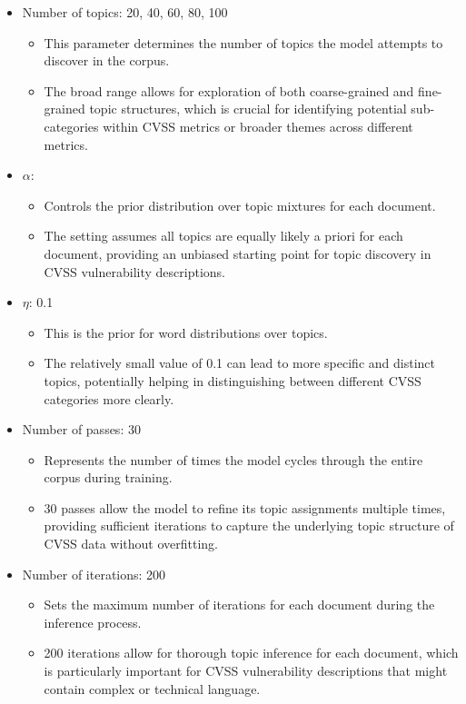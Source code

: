\begin{itemize}
	\item Number of topics: {20, 40, 60, 80, 100}
	      \begin{itemize}
		      \item This parameter determines the number of topics the model attempts to discover in the corpus.
		      \item The broad range allows for exploration of both coarse-grained and fine-grained topic structures, which is crucial for identifying potential sub-categories within CVSS metrics or broader themes across different metrics.
	      \end{itemize}

	\item $\alpha$: {}
	      \begin{itemize}
		      \item Controls the prior distribution over topic mixtures for each document.
		      \item The  setting assumes all topics are equally likely a priori for each document, providing an unbiased starting point for topic discovery in CVSS vulnerability descriptions.
	      \end{itemize}
	\item $\eta$: {0.1}
	      \begin{itemize}
		      \item This is the prior for word distributions over topics.
		      \item The relatively small value of 0.1 can lead to more specific and distinct topics, potentially helping in distinguishing between different CVSS categories more clearly.
	      \end{itemize}
	\item Number of passes: {30}
	      \begin{itemize}
		      \item Represents the number of times the model cycles through the entire corpus during training.
		      \item 30 passes allow the model to refine its topic assignments multiple times, providing sufficient iterations to capture the underlying topic structure of CVSS data without overfitting.
	      \end{itemize}
	\item Number of iterations: {200}
	      \begin{itemize}
		      \item Sets the maximum number of iterations for each document during the inference process.
		      \item 200 iterations allow for thorough topic inference for each document, which is particularly important for CVSS vulnerability descriptions that might contain complex or technical language.
	      \end{itemize}
\end{itemize}

